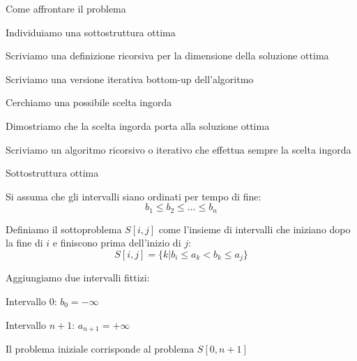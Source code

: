 \begin{frame}{Come affrontare il problema}

\vspace{-9pt}
\begin{myboxtitle}
\BI
\item Individuiamo una sottostruttura ottima
\item Scriviamo una definizione ricorsiva per la dimensione della soluzione ottima
\item Scriviamo una versione iterativa bottom-up dell'algoritmo
\EI
\end{myboxtitle}

\begin{myboxtitle}
\BI
\item Cerchiamo una possibile scelta ingorda
\item Dimostriamo che la scelta ingorda porta alla soluzione ottima
\item Scriviamo un algoritmo ricorsivo o iterativo che effettua sempre la scelta ingorda
\EI
\end{myboxtitle}

\end{frame}

\begin{frame}{Sottostruttura ottima}

\BIL
\item Si assuma che gli intervalli siano ordinati per tempo di fine:\\[-9pt]
\[
	b_1 \leq b_2 \leq \ldots \leq b_n
\]
\item Definiamo il \alert{sottoproblema $S[i,j]$} come l'insieme
di intervalli che iniziano dopo la fine di $i$  e finiscono
prima dell'inizio di $j$:\\[-9pt]
\[
S[i,j] = \{ k |  b_i \leq a_k < b_k \leq a_j \}
\]
\item Aggiungiamo due intervalli fittizi:
\BI
\item Intervallo $0$: $b_0 = -\infty$
\item Intervallo $n+1$: $a_{n+1} = +\infty$
\EI
\item Il problema iniziale corrisponde al problema 
$S[0,n+1]$
\EIL
\begin{center}
\end{center}
\end{frame}

